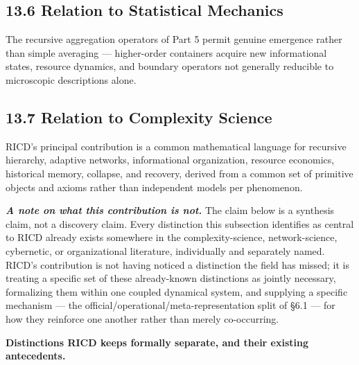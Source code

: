 \documentclass[
]{article}
\begin{document}
\hypertarget{relation-to-statistical-mechanics}{%
\subsection{13.6 Relation to Statistical
Mechanics}\label{relation-to-statistical-mechanics}}

The recursive aggregation operators of Part 5 permit genuine emergence
rather than simple averaging --- higher-order containers acquire new
informational states, resource dynamics, and boundary operators not
generally reducible to microscopic descriptions alone.

\hypertarget{relation-to-complexity-science}{%
\subsection{13.7 Relation to Complexity
Science}\label{relation-to-complexity-science}}

RICD's principal contribution is a common mathematical language for
recursive hierarchy, adaptive networks, informational organization,
resource economics, historical memory, collapse, and recovery, derived
from a common set of primitive objects and axioms rather than
independent models per phenomenon.

\emph{\textbf{A note on what this contribution is not.}} The claim below
is a synthesis claim, not a discovery claim. Every distinction this
subsection identifies as central to RICD already exists somewhere in the
complexity-science, network-science, cybernetic, or organizational
literature, individually and separately named. RICD's contribution is
not having noticed a distinction the field has missed; it is treating a
specific set of these already-known distinctions as jointly necessary,
formalizing them within one coupled dynamical system, and supplying a
specific mechanism --- the official/operational/meta-representation
split of §6.1 --- for how they reinforce one another rather than merely
co-occurring.

\textbf{Distinctions RICD keeps formally separate, and their existing
antecedents.}
\end{document}
